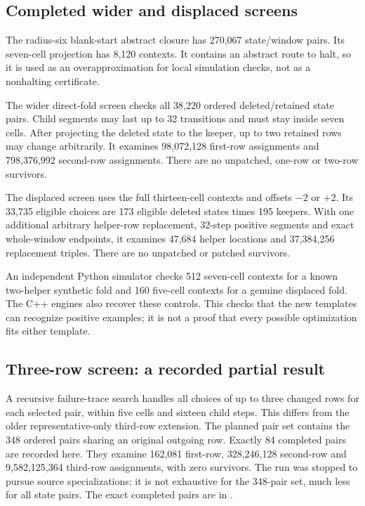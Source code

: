 \subsection{Completed wider and displaced screens}

The radius-six blank-start abstract closure has 270,067 state/window pairs.
Its seven-cell projection has 8,120 contexts. It contains an abstract route
to halt, so it is used as an overapproximation for local simulation checks,
not as a nonhalting certificate.

The wider direct-fold screen checks all 38,220 ordered deleted/retained
state pairs. Child segments may last up to 32 transitions and must stay
inside seven cells. After projecting the deleted state to the keeper, up to
two retained rows may change arbitrarily. It examines 98,072,128 first-row
assignments and 798,376,992 second-row assignments. There are no unpatched,
one-row or two-row survivors.

The displaced screen uses the full thirteen-cell contexts and offsets
$-2$ or $+2$. Its 33,735 eligible choices are 173 eligible deleted states
times 195 keepers. With one additional arbitrary helper-row replacement,
32-step positive segments and exact whole-window endpoints, it examines
47,684 helper locations and 37,384,256 replacement triples. There are no
unpatched or patched survivors.

An independent Python simulator checks 512 seven-cell contexts for a known
two-helper synthetic fold and 160 five-cell contexts for a genuine displaced
fold. The C++ engines also recover these controls. This checks that the new
templates can recognize positive examples; it is not a proof that every
possible optimization fits either template.

\subsection{Three-row screen: a recorded partial result}

A recursive failure-trace search handles all choices of up to three changed
rows for each selected pair, within five cells and sixteen child steps. This
differs from the older representative-only third-row extension. The planned
pair set contains the 348 ordered pairs sharing an original outgoing row.
Exactly 84 completed pairs are recorded here. They examine 162,081 first-row,
328,246,128 second-row and 9,582,125,364 third-row assignments, with zero
survivors. The run was stopped to pursue source specializations; it is not
exhaustive for the 348-pair set, much less for all state pairs. The exact
completed pairs are in .


